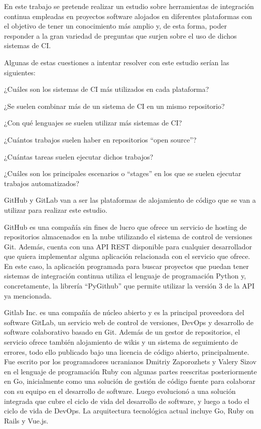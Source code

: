En este trabajo se pretende realizar un estudio sobre herramientas de integración continua empleadas en proyectos software alojados en diferentes plataformas con el objetivo de tener un conocimiento más amplio y, de esta forma, poder responder a la gran variedad de preguntas que surjen sobre el uso de dichos sistemas de CI.

Algunas de estas cuestiones a intentar resolver con este estudio serían las siguientes:
\begin{compactitem}
    \item ¿Cuáles son los sistemas de CI más utilizados en cada plataforma?
    \item ¿Se suelen combinar más de un sistema de CI en un mismo repositorio?
    \item ¿Con qué lenguajes se suelen utilizar más sistemas de CI?
    \item ¿Cuántos trabajos suelen haber en repositorios ``open source''?
    \item ¿Cuántas tareas suelen ejecutar dichos trabajos?
    \item ¿Cuáles son los principales escenarios o ``stages'' en los que se suelen ejecutar trabajos automatizados?
\end{compactitem}

GitHub y GitLab van a ser las plataformas de alojamiento de código que se van a utilizar para realizar este estudio.

GitHub es una compañía sin fines de lucro que ofrece un servicio de hosting de repositorios almacenados en la nube utilizando el sistema de control de versiones Git. 
Además, cuenta con una API REST disponible para cualquier desarrollador que quiera implementar alguna aplicación relacionada con el servicio que ofrece. 
En este caso, la aplicación programada para buscar proyectos que puedan tener sistemas de integración continua utiliza el lenguaje de programación Python y, concretamente, la librería “PyGithub” que permite utilizar la versión 3 de la API ya mencionada.

Gitlab Inc. es una compañía de núcleo abierto y es la principal proveedora del software GitLab, un servicio web de control de versiones, DevOps y desarrollo de software colaborativo basado en Git. Además de un gestor de repositorios, el servicio ofrece también alojamiento de wikis y un sistema de seguimiento de errores, todo ello publicado bajo una licencia de código abierto, principalmente.
Fue escrito por los programadores ucranianos Dmitriy Zaporozhets y Valery Sizov en el lenguaje de programación Ruby con algunas partes reescritas posteriormente en Go, inicialmente como una solución de gestión de código fuente para colaborar con su equipo en el desarrollo de software. Luego evolucionó a una solución integrada que cubre el ciclo de vida del desarrollo de software, y luego a todo el ciclo de vida de DevOps. La arquitectura tecnológica actual incluye Go, Ruby on Rails y Vue.js.

